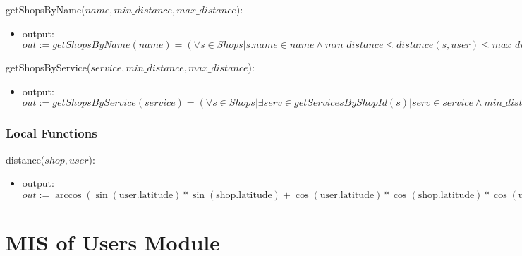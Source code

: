 \documentclass[12pt, titlepage]{article}
\begin{document}
\noindent getShopsByName($name, min\_distance, max\_distance$):
\begin{itemize}
	\item output: $out := getShopsByName(name) = (\forall s \in Shops | s.name \in name \land min\_distance
		      \leq distance(s, user) \leq max\_distance)$
\end{itemize}

\noindent getShopsByService($service, min\_distance, max\_distance$):
\begin{itemize}
	\item output: $out := getShopsByService(service) = (\forall s \in Shops | \exists serv \in
		      getServicesByShopId(s) | serv \in service \land min\_distance \leq distance(s, user) \leq
		      max\_distance)$
\end{itemize}

\subsubsection{Local Functions}

\noindent distance($shop, user$):

\begin{itemize}
	\item output: $out := \arccos(\sin(\text{user.latitude}) * \sin(\text{shop.latitude}) +
		      \cos(\text{user.latitude}) * \cos(\text{shop.latitude}) * \cos(\text{user.longitude} -
			      \text{shop.longitude})) * 6371$
\end{itemize}





\section{MIS of Users Module} \label{mUsers}
\end{document}
